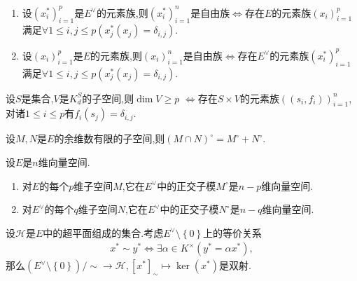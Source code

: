 \begin{corollary}{}{}
	\begin{enumerate}
		\item 设$\left(x_{i}^{\ast}\right)_{i=1}^{p}$是$E^{\vee}$的元素族,则$\left(x_{i}^{\ast}\right)_{i=1}^{n}$是自由族$\iff$存在$E$的元素族$\left(x_{i}\right)_{i=1}^{p}$满足$\forall 1\leq i,j\leq p\left(x_{j}^{\ast}\left(x_{j}\right)=\delta_{i,j}\right)$.
		\item 设$\left(x_{i}\right)_{i=1}^{p}$是$E$的元素族,则$\left(x_{i}\right)_{i=1}^{n}$是自由族$\iff$存在$E^{\vee}$的元素族$\left(x_{i}^{\ast}\right)_{i=1}^{p}$满足$\forall 1\leq i,j\leq p\left(x_{j}^{\ast}\left(x_{j}\right)=\delta_{i,j}\right)$.
	\end{enumerate}
\end{corollary}

\begin{corollary}{}{}
	设$S$是集合,$V$是$K_{d}^{S}$的子空间,则$\dim V\geq p$ $\iff$存在$S\times V$的元素族$\left(\left(s_{i},f_{i}\right)\right)_{i=1}^{n}$,对诸$1\leq i\leq p$有$f_{i}\left(s_{j}\right)=\delta_{i,j}$.
\end{corollary}

\begin{corollary}{}{}
	设$M,N$是$E$的余维数有限的子空间,则$\left(M\cap N\right)^{\circ}=M^{\circ}+N^{\circ}$.
\end{corollary}

\begin{corollary}{}{}
	设$E$是$n$维向量空间.
	\begin{enumerate}
		\item 对$E$的每个$p$维子空间$M$,它在$E^{\vee}$中的正交子模$M^{\circ}$是$n-p$维向量空间.
		\item 对$E^{\vee}$的每个$q$维子空间$N$,它在$E^{\vee}$中的正交子模$N^{\circ}$是$n-q$维向量空间.
	\end{enumerate}
\end{corollary}

\begin{proposition}{}{}
	设$\mathcal{H}$是$E$中的超平面组成的集合.考虑$E^{\vee}\setminus\left\{0\right\}$上的等价关系
	\begin{align*}
		x^{\ast}\sim y^{\ast}\iff\exists\alpha\in K^{\times}\left(y^{\ast}=\alpha x^{\ast}\right),
	\end{align*}
	那么$\left(E^{\vee}\setminus\left\{0\right\}\right)/\sim\to\mathcal{H},\left[x^{\ast}\right]_{\sim}\mapsto\ker\left(x^{\ast}\right)$是双射.
\end{proposition}

